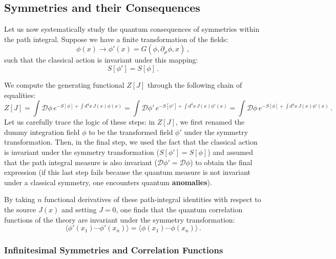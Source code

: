 \subsection{Symmetries and their Consequences}

Let us now systematically study the quantum consequences of symmetries within the path integral. Suppose we have a finite transformation of the fields:
\begin{equation} \label{eq:finite_symmetry_transform}
    \phi(x) \rightarrow \phi'(x) = G(\phi, \partial_\mu\phi, x) \, ,
\end{equation}
such that the classical action is invariant under this mapping:
\begin{equation} \label{eq:action_invariance_finite}
    S[\phi'] = S[\phi] \, .
\end{equation}

We compute the generating functional \(Z[J]\) through the following chain of equalities:
\begin{equation} \label{eq:z_symmetry_derivation}
    Z[J] = \int \mathcal{D}\phi \, e^{-S[\phi] + \int d^4x \, J(x)\phi(x)} = \int \mathcal{D}\phi' \, e^{-S[\phi'] + \int d^4x \, J(x)\phi'(x)} = \int \mathcal{D}\phi \, e^{-S[\phi] + \int d^4x \, J(x)\phi'(x)} \, .
\end{equation}
Let us carefully trace the logic of these steps: in \(Z[J]\), we first renamed the dummy integration field \(\phi\) to be the transformed field \(\phi'\) under the symmetry transformation. Then, in the final step, we used the fact that the classical action is invariant under the symmetry transformation (\(S[\phi'] = S[\phi]\)) and assumed that the path integral measure is also invariant (\(\mathcal{D}\phi' = \mathcal{D}\phi\)) to obtain the final expression (if this last step fails because the quantum measure is not invariant under a classical symmetry, one encounters quantum \textbf{anomalies}).

By taking \(n\) functional derivatives of these path-integral identities with respect to the source \(J(x)\) and setting \(J=0\), one finds that the quantum correlation functions of the theory are invariant under the symmetry transformation:
\begin{equation} \label{eq:correlator_invariance_finite}
    \boxed{\langle \phi'(x_1) \cdots \phi'(x_n) \rangle = \langle \phi(x_1) \cdots \phi(x_n) \rangle} \, .
\end{equation}

\subsubsection{Infinitesimal Symmetries and Correlation Functions}

